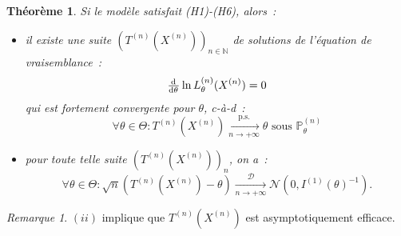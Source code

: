 \documentclass{report}
\renewcommand{\P}{\mathbb P}
\newcommand{\pinfty}{{+\infty}}
\newcommand{\cvgd}{\xrightarrow[n \to \pinfty]{\mathcal D}}
\newcommand{\ps}{{\text{p.s.}}}
\newcommand{\cvgps}{\xrightarrow[n \to \pinfty]\ps}
\newcommand{\N}{\mathbb N}
\newcommand{\n}{{(n)}}
\newcommand{\Xn}{{X^\n}}
\newcommand{\Tn}{{T^\n}}
\newcommand{\TnXn}{{\Tn(\Xn)}}
\newtheorem{thm}{Théorème}[chapter]
\theoremstyle{definition}
\theoremstyle{remark}
\newtheorem*{rmq}{Remarque}
\begin{document}
			\begin{thm} Si le modèle satisfait (H1)-(H6), alors~:
			\begin{itemize}
				\item[$(i)$] il existe une suite $(\TnXn)_{n \in \N}$ de solutions de l'équation de vraisemblance~:
				\[\od {}\theta \ln L_\theta^{(n)}(\Xn) = 0\]
				qui est fortement convergente pour $\theta$, c-à-d~:
				\[\forall \theta \in \Theta : \TnXn \cvgps \theta \text{ sous } \P_\theta^\n\]
				\item[$(ii)$] pour toute telle suite $(\TnXn)_n$, on a~:
				\[\forall \theta \in \Theta : \sqrt n(\TnXn - \theta) \cvgd \mathcal N(0, I^{(1)}(\theta)^{-1}).\]
			\end{itemize}
			\end{thm}

			\begin{rmq} $(ii)$ implique que $\TnXn$ est asymptotiquement efficace.
			\end{rmq}
\end{document}
